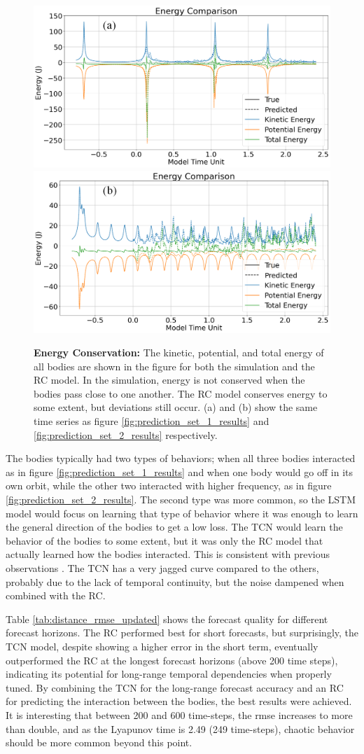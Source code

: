 \documentclass[%
 reprint,
 amsmath,amssymb,
 aps,
]{revtex4-2}
\begin{document}
\begin{figure}
    \centering
    \includegraphics[width=0.497\linewidth]{plot_1_Energy_Reservoir_marked.png}
    \includegraphics[width=0.497\linewidth]{plot_3_Energy_Reservoir_marked.png}
    \caption{\textbf{Energy Conservation:} The kinetic, potential, and total energy of all bodies are shown in the figure for both the simulation and the RC model. In the simulation, energy is not conserved when the bodies pass close to one another. The RC model conserves energy to some extent, but deviations still occur. (a) and (b) show the same time series as figure \ref{fig:prediction_set_1_results} and \ref{fig:prediction_set_2_results} respectively.}
    \label{fig:energy}
\end{figure}

The bodies typically had two types of behaviors; when all three bodies interacted as in figure \ref{fig:prediction_set_1_results} and when one body would go off in its own orbit, while the other two interacted with higher frequency, as in figure \ref{fig:prediction_set_2_results}. The second type was more common, so the LSTM model would focus on learning that type of behavior where it was enough to learn the general direction of the bodies to get a low loss. The TCN would learn the behavior of the bodies to some extent, but it was only the RC model that actually learned how the bodies interacted. This is consistent with previous observations \cite{pathak2018model}. The TCN has a very jagged curve compared to the others, probably due to the lack of temporal continuity, but the noise dampened when combined with the RC.

Table \ref{tab:distance_rmse_updated} shows the forecast quality for different forecast horizons. The RC performed best for short forecasts, but surprisingly, the TCN model, despite showing a higher error in the short term, eventually outperformed the RC at the longest forecast horizons (above 200 time steps), indicating its potential for long-range temporal dependencies when properly tuned. By combining the TCN for the long-range forecast accuracy and an RC for predicting the interaction between the bodies, the best results were achieved. It is interesting that between 200 and 600 time-steps, the rmse increases to more than double, and as the Lyapunov time is 2.49 (249 time-steps), chaotic behavior should be more common beyond this point.
\end{document}
